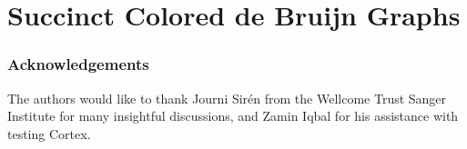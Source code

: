 \chapter{Succinct Colored de Bruijn Graphs}

\begin{quote}

\end{quote}





\subsection*{Acknowledgements}
The authors would like to thank Journi Sir\'{e}n from the Wellcome Trust Sanger Institute for many insightful discussions, and Zamin Iqbal for his assistance with testing {\sc Cortex}.



